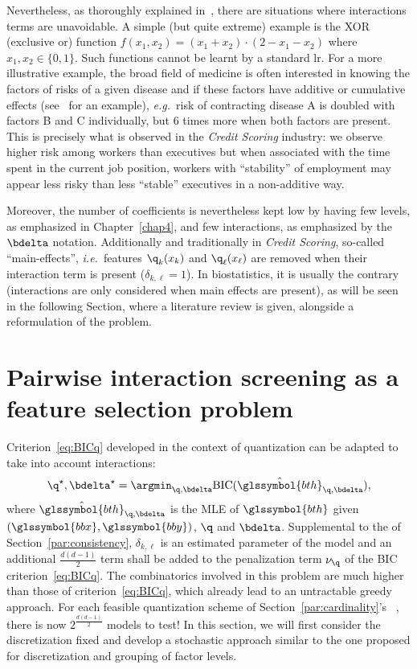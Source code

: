 Nevertheless, as thoroughly explained in~\cite{berry2010testing}, there are situations where interactions terms are unavoidable. A simple (but quite extreme) example is the XOR (exclusive or) function $f(x_1,x_2) = (x_1 + x_2)\cdot(2 - x_1 - x_2)$ where $x_1,x_2 \in \{0,1\}$. Such functions cannot be learnt by a standard \gls{lr}. For a more illustrative example, the broad field of medicine is often interested in knowing the factors of risks of a given disease and if these factors have additive or cumulative effects (see~\cite{morgan2014adversity} for an example), \textit{e.g.}\ risk of contracting disease A is doubled with factors B and C individually, but 6 times more when both factors are present. This is precisely what is observed in the \textit{Credit Scoring} industry: we observe higher risk among workers than executives but when associated with the time spent in the current job position, workers with ``stability'' of employment may appear less risky than less ``stable'' executives in a non-additive way.

Moreover, the number of coefficients is nevertheless kept low by having few levels, as emphasized in Chapter~\ref{chap4}, and few interactions, as emphasized by the $\bdelta$ notation. Additionally and traditionally in \textit{Credit Scoring}, so-called ``main-effects'', \textit{i.e.}\ features $\q_k(x_k)$ and $\q_\ell(x_\ell)$ are removed when their interaction term is present ($\delta_{k,\ell} = 1$). In biostatistics, it is usually the contrary (interactions are only considered when main effects are present), as will be seen in the following Section, where a literature review is given, alongside a reformulation of the problem.


\section{Pairwise interaction screening as a feature selection problem}

Criterion~\eqref{eq:BICq} developed in the context of quantization can be adapted to take into account interactions:
\begin{equation} \label{eq:criterion_inter}
\q^\star,\bdelta^\star = \argmin_{\q,\bdelta} \text{BIC}(\hat{\glssymbol{bth}}_{\q,\bdelta}),
\end{equation}
where $\hat{\glssymbol{bth}}_{\q,\bdelta}$ is the MLE of $\glssymbol{bth}$ given $(\glssymbol{bbx},\glssymbol{bby})$, $\q$ and $\bdelta$. Supplemental to the  of Section~\ref{par:consistency}, $\delta_{k,\ell}$ is an estimated parameter of the model and an additional $\frac{d(d-1)}{2}$ term shall be added to the penalization term $\nu_\q$ of the BIC criterion~\eqref{eq:BICq}. The combinatorics involved in this problem are much higher than those of criterion~\eqref{eq:BICq}, which already lead to an untractable greedy approach. For each feasible quantization scheme of Section~\ref{par:cardinality}'s ~, there is now $2^{\frac{d(d-1)}{2}}$ models to test! In this section, we will first consider the discretization fixed and develop a stochastic approach similar to the one proposed for discretization and grouping of factor levels.

